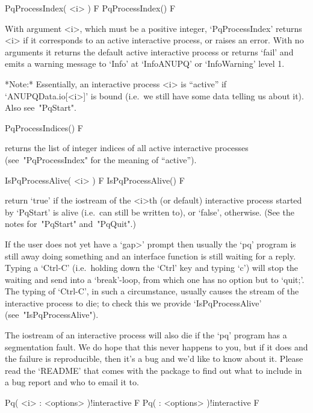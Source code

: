 \>PqProcessIndex( <i> ) F
\>PqProcessIndex() F

With argument <i>, which must be  a  positive  integer,  `PqProcessIndex'
returns <i> if it corresponds to an active interactive process, or raises
an error. With no arguments it returns  the  default  active  interactive
process or returns `fail' and  emits  a  warning  message  to  `Info'  at
`InfoANUPQ' or `InfoWarning' level 1.

*Note:*
Essentially,  an  interactive  {\ANUPQ}  process  <i>  is  ``active''  if
`ANUPQData.io[<i>]' is bound (i.e.~we still have  some  data  telling  us
about it). Also see~"PqStart".

\>PqProcessIndices() F

returns the list of integer indices of all  active  interactive  {\ANUPQ}
processes (see~"PqProcessIndex" for the meaning of ``active'').

\>IsPqProcessAlive( <i> ) F
\>IsPqProcessAlive() F

return  `true'  if  the  {\GAP}  iostream  of  the  <i>th  (or   default)
interactive {\ANUPQ} process started  by  `PqStart'  is  alive  (i.e.~can
still be written to), or `false', otherwise. (See the notes for~"PqStart"
and~"PqQuit".)

If the user does not yet have a  `gap>'  prompt  then  usually  the  `pq'
program is still away doing something and an {\ANUPQ}  interface  function
is still waiting for a reply. Typing a `Ctrl-C'  (i.e.~holding  down  the
`Ctrl' key and typing `c') will stop the waiting and send {\GAP}  into  a
`break'-loop, from which one has no option but to `quit;'. The typing  of
`Ctrl-C', in such a  circumstance,  usually  causes  the  stream  of  the
interactive  {\ANUPQ}  process  to  die;  to  check   this   we   provide
`IsPqProcessAlive' (see~"IsPqProcessAlive").

The {\GAP} iostream of an interactive {\ANUPQ} process will also  die  if
the `pq' program has a segmentation fault. We do  hope  that  this  never
happens to you, but if it does and the failure is reproducible, then it's
a bug and we'd like to know about it. Please read the `README' that comes
with the {\ANUPQ} package to find out what to include in a bug report and
who to email it to.


\>Pq( <i> : <options> )!{interactive} F
\>Pq( : <options> )!{interactive} F

